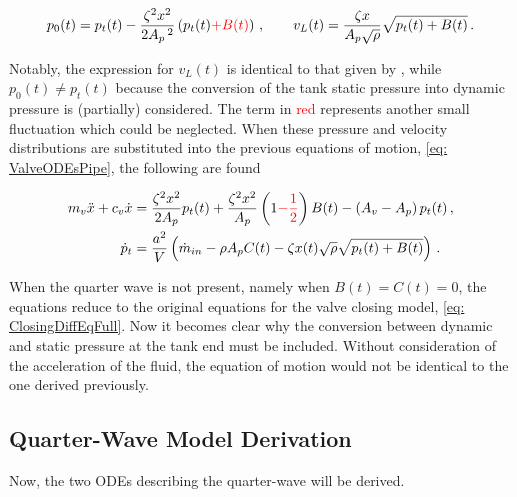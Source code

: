 \begin{equation*}
    p_0(t) = p_t(t) - \frac{\zeta^2 x^2}{2 A_p\,^2} \left( p_t(t) \textcolor{Red}{+ B(t)} \right)
    \, , \qquad
    v_L(t) = \frac{\zeta x}{A_p \sqrt{\rho}} \sqrt{p_t(t) + B(t)} \, .
\end{equation*}

Notably, the expression for $v_L(t)$ is identical to that given by \cite{Hos2015ModelPipe}, while $p_0(t) \neq p_t(t)$ because the conversion of the tank static pressure into dynamic pressure is (partially) considered. The term in \textcolor{Red}{red} represents another small fluctuation which could be neglected. When these pressure and velocity distributions are substituted into the previous equations of motion, \cref{eq: ValveODEsPipe}, the following are found

\begin{equation*}
\begin{split}
    m_v \ddot{x} + c_v \dot{x} &= \frac{\zeta^2 x^2}{2 A_p} p_t(t) + \frac{\zeta^2 x^2}{A_p} \left( 1 \textcolor{Red}{- \frac{1}{2}} \right) B(t) - \left( A_v - A_p \right) p_t(t)
    \, , \\
    \dot{p}_t &= \frac{a^2}{V} \left( \dot{m}_{in} - \rho A_p C(t) - \zeta x(t) \sqrt{\rho} \sqrt{p_t(t) + B(t)} \right) \, .
\end{split}
\end{equation*}

When the quarter wave is not present, namely when $B(t) = C(t) = 0$, the equations reduce to the original equations for the valve closing model, \cref{eq: ClosingDiffEqFull}. Now it becomes clear why the conversion between dynamic and static pressure at the tank end must be included. Without consideration of the acceleration of the fluid, the equation of motion would not be identical to the one derived previously.

\subsection{Quarter-Wave Model Derivation} \label{sec: QWM Derivation}

Now, the two ODEs describing the quarter-wave will be derived.

